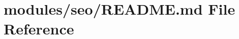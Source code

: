 \hypertarget{modules_2seo_2README_8md}{\section{modules/seo/\-R\-E\-A\-D\-M\-E.md File Reference}
\label{modules_2seo_2README_8md}
}
